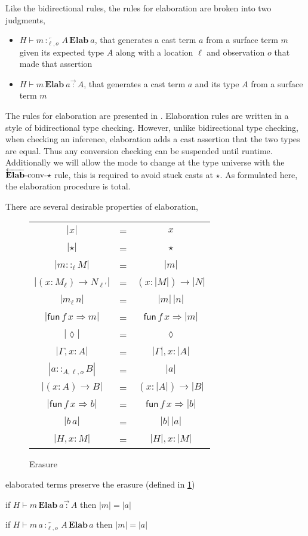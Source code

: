 Like the bidirectional rules, the rules for elaboration are broken into two judgments,
\begin{itemize}
\item $H\vdash m\overleftarrow{\,:_{\ell,o}\,}A\,\textbf{Elab}\ a$, that generates a cast term $a$ from a surface term $m$ given its expected type $A$ along with a location $\ell$ and observation $o$ that made that assertion
\item $H\vdash m\,\textbf{Elab}\ a\overrightarrow{\,:\,}A$, that generates a cast term $a$ and its type $A$ from a surface term $m$
\end{itemize}
The rules for elaboration are presented in .
Elaboration rules are written in a style of bidirectional type checking.
However, unlike bidirectional type checking, when checking an inference, elaboration adds a cast assertion that the two types are equal.
Thus any conversion checking can be suspended until runtime.
Additionally we will allow the mode to change at the type universe with the $\operatorname{\overleftarrow{\textbf{Elab}}-conv-\star}$ rule, this is required to avoid stuck casts at $\star$.
As formulated here, the elaboration procedure is total.
 
There are several desirable properties of elaboration,
 
\begin{figure}
\begin{tabular}{ccc}
$|x|$ & = & $x$\tabularnewline
$|\star|$ & = & $\star$\tabularnewline
$|m::_{\ell}M|$ & = & $|m|$\tabularnewline
$|\left(x:M_{\ensuremath{\ell}}\right)\rightarrow N_{\ensuremath{\ell'}}|$ & = & $\left(x:|M|\right)\rightarrow|N|$\tabularnewline
$|m_{\ensuremath{\ell}}\,n|$ & = & $|m|\,|n|$\tabularnewline
$|\mathsf{fun}\,f\,x\Rightarrow m|$ & = & $\mathsf{fun}\,f\,x\Rightarrow|m|$\tabularnewline
$|\lozenge|$ & = & $\lozenge$\tabularnewline
$|\Gamma,x:A|$ & = & $|\Gamma|,x:|A|$\tabularnewline
$|a::_{A,\ensuremath{\ell},o}B|$ & = & $|a|$\tabularnewline
$|\left(x:A\right)\rightarrow B|$ & = & $\left(x:|A|\right)\rightarrow|B|$\tabularnewline
$|\mathsf{fun}\,f\,x\Rightarrow b|$ & = & $\mathsf{fun}\,f\,x\Rightarrow|b|$\tabularnewline
$|b\,a|$ & = & $|b|\,|a|$\tabularnewline
$|H,x:M|$ & = & $|H|,x:|M|$\tabularnewline
\end{tabular}\caption{Erasure}
\label{fig:erasure}
\end{figure}
 
\begin{thm}
elaborated terms preserve the erasure (defined in \ref{fig:erasure})
 
if $H\vdash m\,\textbf{Elab}\ a\overrightarrow{\,:\,}A$ then $|m|=|a|$
 
if $H\vdash m\,a\overleftarrow{\,:_{\ensuremath{\ell},o}\,}A\,\textbf{Elab}\,a$
then $|m|=|a|$
\end{thm}
 
